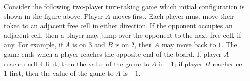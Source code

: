 \documentclass[11pt, a4paper]{article}
\begin{document}
\begin{figure}[h]
    \centering
\end{figure}

Consider the following two-player turn-taking game which initial configuration is shown in the figure above. Player $A$ moves first. Each player must move their token to an adjacent free cell in either direction. If the opponent occupies an adjacent cell, then a player may jump over the opponent to the next free cell, if any. For example, if $A$ is on $3$ and $B$ is on $2$, then $A$ may move back to $1$. The game ends when a player reaches the opposite end of the board. If player $A$ reaches cell $4$ first, then the value of the game to $A$ is $+1$; if player $B$ reaches cell $1$ first, then the value of the game to $A$ is $-1$.
\end{document}
